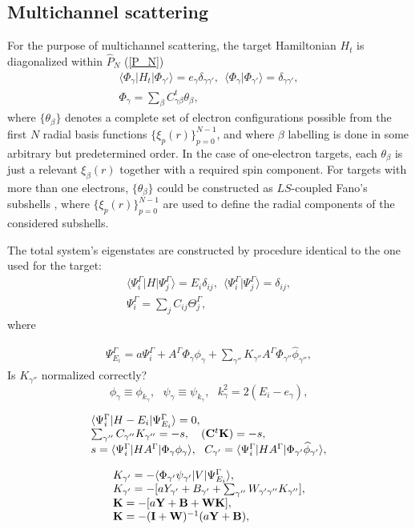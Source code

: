 \documentclass[aip
, pra
, showpacs
, aps
, twocolumn
, groupedaddress
, floatfix
]{revtex4}
\newcommand{\beq}{\begin{equation}}
\newcommand{\eeq}{\end{equation}}
\newcommand{\barr}{\begin{array}}
\newcommand{\earr}{\end{array}}
\begin{document}
\subsection{Multichannel scattering}
For the purpose of multichannel scattering, the target Hamiltonian $H_t$ is diagonalized within $\hat{P}_N$ (\ref{P_N}) 
\beq \barr{l}
\langle \Phi_\gamma|H_t|\Phi_{\gamma'}\rangle=e_\gamma \delta_{\gamma\gamma'}, \ \
\langle \Phi_\gamma|\Phi_{\gamma'}\rangle=\delta_{\gamma\gamma'},\\
\Phi_\gamma = \sum_{\beta} C^t_{\gamma \beta} \theta_\beta,
\earr \label{Phi_H_Phi} \eeq
where $\{\theta_\beta\}$ denotes a complete set of electron configurations possible  from
the first $N$ radial basis functions $\{\xi_p(r)\}_{p=0}^{N-1}$, 
and where $\beta$ labelling is done in some arbitrary but predetermined order. 
In the case of one-electron targets, each 
$\theta_\beta$ is just a relevant $\xi_\beta(r)$ together with a required spin component. 
For targets with more than one electrons, $\{\theta_\beta\}$ could be constructed as $LS$-coupled Fano's subshells \cite{Fano65,KFB11}, 
where $\{\xi_p(r)\}_{p=0}^{N-1}$ are used to define the radial components of the considered subshells.


The total system's eigenstates are constructed by procedure identical to the one used for the target:
\beq \barr{l}
\langle\Psi_i^\Gamma|H|\Psi_j^\Gamma\rangle=E_i\delta_{ij}, \ \
 \langle\Psi_i^\Gamma|\Psi_j^\Gamma\rangle=\delta_{ij},\\
\Psi^\Gamma_i = \sum_{j} C_{ij} \Theta^\Gamma_j,
\earr \label{Psi_H_Psi} \eeq
where 


\beq \barr{l}
 \Psi_{E_i}^{\Gamma}  =  a \Psi_i^{\Gamma}
 + A^{\Gamma} \Phi_{\gamma}  \phi_{\gamma}
+ \sum_{\gamma''} K_{\gamma''} A^{\Gamma} \Phi_{\gamma''}   \widehat{\phi}_{\gamma''} ,
\earr \label{Psi_} \eeq
Is $K_{\gamma''}$ normalized correctly?
\beq
\phi_{\gamma}\equiv \phi_{k_\gamma}, \ \ \ \psi_{\gamma}\equiv \psi_{k_\gamma}, \ \ \   k_{\gamma}^2 = 2(E_i - e_\gamma),
\eeq


\beq \barr{l}
\langle\Psi_i^\Gamma|H-E_i|\Psi_{E_i}^{\Gamma}\rangle=0,\\
\sum_{\gamma''}  C_{\gamma''} K_{\gamma''}  = -s
, \ \ \ ({\bf C}^t {\bf K}) = -s,\\
s = \langle \Psi_i^\Gamma |HA^{\Gamma} |\Phi_{\gamma} \phi_{\gamma} \rangle,\ \
C_{\gamma'} =  \langle \Psi_i^\Gamma |HA^{\Gamma} |\Phi_{\gamma'} \widehat{\phi}_{\gamma'} \rangle,
\earr \label{Psi_} \eeq

\beq \barr{l}
K_{\gamma'} = - \langle \Phi_{\gamma'}  \psi_{\gamma'}
| V | \Psi_{E_i}^{ \Gamma} \rangle,\\
K_{\gamma'} =   - [a Y_{\gamma'}   + B_{\gamma'}
+ \sum_{\gamma''}  W_{\gamma' \gamma''} K_{\gamma''}],\\
{\bf K} =   -[a {\bf Y} + {\bf B} + {\bf W K}],\\
{\bf K}  = -({\bf I}+{\bf W})^{-1}   (a {\bf Y}    + {\bf B}),
\earr \eeq
\end{document}
